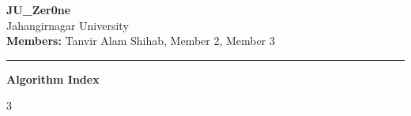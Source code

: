 \documentclass[8pt, a4paper]{article}
\begin{document}
\thispagestyle{empty}

\begin{center}
    {\Large \bfseries JU\_Zer0ne}\\[3pt]
    {\small Jahangirnagar University}\\[3pt]
    {\textbf{Members:} Tanvir Alam Shihab, Member 2, Member 3}
\end{center}

\vspace{-3pt}
\hrule
\vspace{6pt}

\begin{center}
    {\small \bfseries Algorithm Index}
\end{center}

\vspace{-5pt}

\begin{multicols*}{3}
\tableofcontents
\end{multicols*}

\newpage
\setcounter{page}{2}
\end{document}

